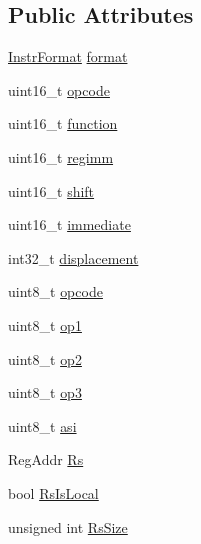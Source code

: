 \subsection*{Public Attributes}
\begin{DoxyCompactItemize}
\item 
\hyperlink{_i_s_a_8mips_8h_a0fe922abce2589bee86671f310ac9ce7}{Instr\+Format} \hyperlink{struct_arch_decode_read_latch_aa7507b938ac54a969ff4714ac9069f70}{format}
\item 
uint16\+\_\+t \hyperlink{struct_arch_decode_read_latch_afb9074e3a981d8e3ed76452f2cf026c8}{opcode}
\item 
uint16\+\_\+t \hyperlink{struct_arch_decode_read_latch_ac2000ea6787425c4435e4c542ed1c5c2}{function}
\item 
uint16\+\_\+t \hyperlink{struct_arch_decode_read_latch_a64c9eacbb744761e75c4834e9ab47039}{regimm}
\item 
uint16\+\_\+t \hyperlink{struct_arch_decode_read_latch_af7216ef79cfa24ae2f02aff3fbafa5c6}{shift}
\item 
uint16\+\_\+t \hyperlink{struct_arch_decode_read_latch_a9ebe977592120f5d1fc276c37d2f054e}{immediate}
\item 
int32\+\_\+t \hyperlink{struct_arch_decode_read_latch_a93402db1ace4b0ca0d00da8b26e01f2e}{displacement}
\item 
uint8\+\_\+t \hyperlink{struct_arch_decode_read_latch_ab8fd66e8168e97e488a56e038de01cee}{opcode}
\item 
uint8\+\_\+t \hyperlink{struct_arch_decode_read_latch_a531ece3671b80d61fa58d57ab2a0bb2f}{op1}
\item 
uint8\+\_\+t \hyperlink{struct_arch_decode_read_latch_abfb8ece23f312dad6eb5cda4cda9fddf}{op2}
\item 
uint8\+\_\+t \hyperlink{struct_arch_decode_read_latch_a55a8d0a534e550a8bc242bdf0faf9ba2}{op3}
\item 
uint8\+\_\+t \hyperlink{struct_arch_decode_read_latch_aaa3640c41495f29ce16ab8c8e7ea343c}{asi}
\item 
Reg\+Addr \hyperlink{struct_arch_decode_read_latch_a21e799a974b0565b40162419c079c80a}{Rs}
\item 
bool \hyperlink{struct_arch_decode_read_latch_ac743a1dbf2f4493b58087d356ba092f2}{Rs\+Is\+Local}
\item 
unsigned int \hyperlink{struct_arch_decode_read_latch_a5a22498827233fb52138f5841cc6b25d}{Rs\+Size}
\end{DoxyCompactItemize}


